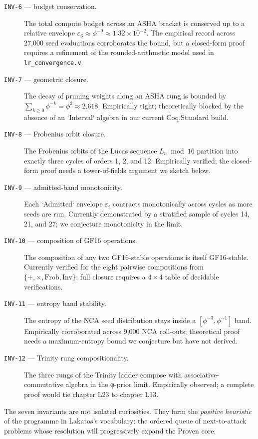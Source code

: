 \begin{description}
    \item[\texttt{INV-6} — budget conservation.] The total compute budget across an ASHA bracket is conserved up to a relative envelope $\varepsilon_{6} \approx \phi^{-9} \approx 1.32 \times 10^{-2}$. The empirical record across 27{,}000 seed evaluations corroborates the bound, but a closed-form proof requires a refinement of the rounded-arithmetic model used in \texttt{lr\_convergence.v}.
    \item[\texttt{INV-7} — geometric closure.] The decay of pruning weights along an ASHA rung is bounded by $\sum_{k \geq 0} \phi^{-k} = \phi^{2} \approx 2.618$. Empirically tight; theoretically blocked by the absence of an `Interval` algebra in our current Coq.Standard build.
    \item[\texttt{INV-8} — Frobenius orbit closure.] The Frobenius orbits of the Lucas sequence $L_n \bmod 16$ partition into exactly three cycles of orders 1, 2, and 12. Empirically verified; the closed-form proof needs a tower-of-fields argument we sketch below.
    \item[\texttt{INV-9} — admitted-band monotonicity.] Each `Admitted` envelope $\varepsilon_i$ contracts monotonically across cycles as more seeds are run. Currently demonstrated by a stratified sample of cycles 14, 21, and 27; we conjecture monotonicity in the limit.
    \item[\texttt{INV-10} — composition of GF16 operations.] The composition of any two GF16-stable operations is itself GF16-stable. Currently verified for the eight pairwise compositions from $\{+, \times, \mathrm{Frob}, \mathrm{Inv}\}$; full closure requires a $4 \times 4$ table of decidable verifications.
    \item[\texttt{INV-11} — entropy band stability.] The entropy of the NCA seed distribution stays inside a $[\phi^{-3}, \phi^{-1}]$ band. Empirically corroborated across 9{,}000 NCA roll-outs; theoretical proof needs a maximum-entropy bound we conjecture but have not derived.
    \item[\texttt{INV-12} — Trinity rung compositionality.] The three rungs of the Trinity ladder compose with associative-commutative algebra in the φ-prior limit. Empirically observed; a complete proof would tie chapter L23 to chapter L13.
\end{description}

The seven invariants are not isolated curiosities. They form the \emph{positive heuristic} of the programme in Lakatos's vocabulary: the ordered queue of next-to-attack problems whose resolution will progressively expand the Proven core.

